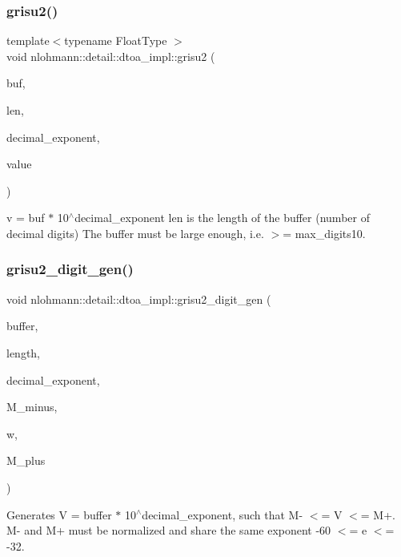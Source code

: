 \subsubsection{\texorpdfstring{grisu2()}{grisu2()}\hspace{0.1cm}{\footnotesize\ttfamily [2/2]}}
{\footnotesize\ttfamily template$<$typename Float\+Type $>$ \\
void nlohmann\+::detail\+::dtoa\+\_\+impl\+::grisu2 (\begin{DoxyParamCaption}\item[{char $\ast$}]{buf,  }\item[{int \&}]{len,  }\item[{int \&}]{decimal\+\_\+exponent,  }\item[{Float\+Type}]{value }\end{DoxyParamCaption})}

v = buf $\ast$ 10$^\wedge$decimal\+\_\+exponent len is the length of the buffer (number of decimal digits) The buffer must be large enough, i.\+e. $>$= max\+\_\+digits10. \mbox{\label{namespacenlohmann_1_1detail_1_1dtoa__impl_a9b899c72b0e1e3dd46d75c2b4e6bcdfb}} 
\subsubsection{\texorpdfstring{grisu2\+\_\+digit\+\_\+gen()}{grisu2\_digit\_gen()}}
{\footnotesize\ttfamily void nlohmann\+::detail\+::dtoa\+\_\+impl\+::grisu2\+\_\+digit\+\_\+gen (\begin{DoxyParamCaption}\item[{char $\ast$}]{buffer,  }\item[{int \&}]{length,  }\item[{int \&}]{decimal\+\_\+exponent,  }\item[{\hyperlink{structnlohmann_1_1detail_1_1dtoa__impl_1_1diyfp}{diyfp}}]{M\+\_\+minus,  }\item[{\hyperlink{structnlohmann_1_1detail_1_1dtoa__impl_1_1diyfp}{diyfp}}]{w,  }\item[{\hyperlink{structnlohmann_1_1detail_1_1dtoa__impl_1_1diyfp}{diyfp}}]{M\+\_\+plus }\end{DoxyParamCaption})\hspace{0.3cm}{\ttfamily [inline]}}

Generates V = buffer $\ast$ 10$^\wedge$decimal\+\_\+exponent, such that M-\/ $<$= V $<$= M+. M-\/ and M+ must be normalized and share the same exponent -\/60 $<$= e $<$= -\/32. 